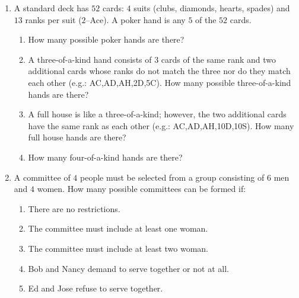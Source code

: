 \documentclass[letterpaper,12pt,fleqn]{article}
\begin{document}
\begin{enumerate}[left=0in,itemsep=0.5in]
\item A standard deck has \(52\) cards: \(4\) suits (clubs, diamonds, hearts, spades) and \(13\) ranks per suit
  (\(2\)--Ace).  A poker hand is any \(5\) of the \(52\) cards.
  \begin{enumerate}
  \item How many possible poker hands are there?
  \item A three-of-a-kind hand consists of \(3\) cards of the same rank and two additional cards whose ranks do not
    match the three nor do they match each other (e.g.: AC,AD,AH,2D,5C).  How many possible three-of-a-kind hands
    are there?
  \item A full house is like a three-of-a-kind; however, the two additional cards have the same rank as each other
    (e.g.: AC,AD,AH,10D,10S).  How many full house hands are there?
  \item How many four-of-a-kind hands are there?
  \end{enumerate}

\item A committee of \(4\) people must be selected from a group consisting of \(6\) men and \(4\) women.  How many
  possible committees can be formed if:
  \begin{enumerate}
  \item There are no restrictions.
  \item The committee must include at least one woman.
  \item The committee must include at least two woman.
  \item Bob and Nancy demand to serve together or not at all.
  \item Ed and Jose refuse to serve together.
  \end{enumerate}
\end{enumerate}
\end{document}
